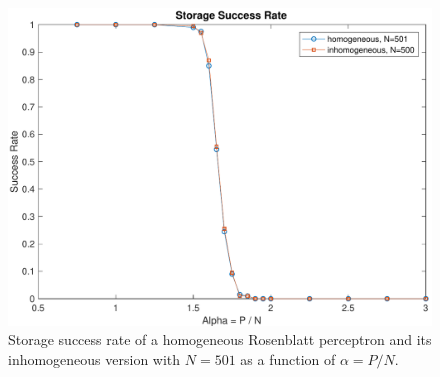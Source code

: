 \begin{figure}[t]
	\centering
	\includegraphics[width=\columnwidth]{figures/homogeneous_n_n1}
    \caption{Storage success rate of a homogeneous Rosenblatt perceptron and its inhomogeneous version with $N = 501$ as a function of $\alpha = P / N$.}
	\label{fig:homogeneous_n_n1}
\end{figure}
